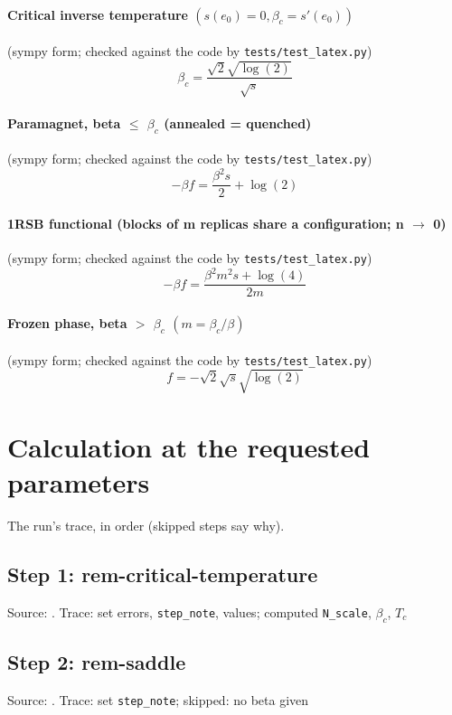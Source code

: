 \documentclass[11pt]{article}
\begin{document}
\paragraph{Critical inverse temperature $(s(e_{0}) = 0, \beta _{c} = s'(e_{0}))$} (sympy form; checked against the code by \texttt{tests/test\_latex.py})
\begin{equation}
\beta_{c} = \frac{\sqrt{2} \sqrt{\log{\left(2 \right)}}}{\sqrt{s}}
\end{equation}
\paragraph{Paramagnet, beta $\leq$ $\beta _{c}$ (annealed = quenched)} (sympy form; checked against the code by \texttt{tests/test\_latex.py})
\begin{equation}
- \beta f = \frac{\beta^{2} s}{2} + \log{\left(2 \right)}
\end{equation}
\paragraph{1RSB functional (blocks of m replicas share a configuration; n $\to$ 0)} (sympy form; checked against the code by \texttt{tests/test\_latex.py})
\begin{equation}
- \beta f = \frac{\beta^{2} m^{2} s + \log{\left(4 \right)}}{2 m}
\end{equation}
\paragraph{Frozen phase, beta $>$ $\beta _{c}$ $(m = \beta _{c} / \beta )$} (sympy form; checked against the code by \texttt{tests/test\_latex.py})
\begin{equation}
f = - \sqrt{2} \sqrt{s} \sqrt{\log{\left(2 \right)}}
\end{equation}
\section{Calculation at the requested parameters}
The run's trace, in order (skipped steps say why).
\subsection{Step 1: rem-critical-temperature}
Source: \cite{b1,b2}. Trace: set errors, \texttt{step\_note}, values; computed \texttt{N\_scale}, $\beta _{c}$, $T_{c}$

\subsection{Step 2: rem-saddle}
Source: \cite{b1,b2,b3}. Trace: set \texttt{step\_note}; skipped: no beta given
\end{document}
